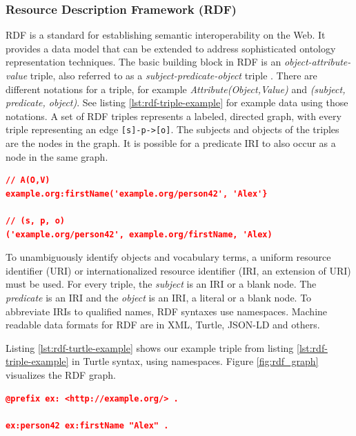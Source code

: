\subsubsection{Resource Description Framework (RDF)}
RDF is a standard for establishing semantic interoperability on the Web. 
It provides a data model that can be extended to address sophisticated ontology representation techniques.
The basic building block in RDF is an \textit{object-attribute-value} triple\cite{decker2000semantic}, also referred to as a \textit{subject-predicate-object} triple \cite{hogan2021knowledge}.
There are different notations for a triple, for example \textit{Attribute(Object,Value)} and \textit{(subject, predicate, object)}.
See listing \ref{lst:rdf-triple-example} for example data using those notations.
A set of RDF triples represents a labeled, directed graph, with every triple representing an edge \texttt{[s]-p->[o]}.
The subjects and objects of the triples are the nodes in the graph.
It is possible for a predicate IRI to also occur as a node in the same graph.\cite{w3c_rdf}


\begin{lstlisting}[language=json,basicstyle=\scriptsize,firstnumber=1,caption={Different notations for an RDF triple},captionpos=b,label={lst:rdf-triple-example}]
// A(O,V)
example.org:firstName('example.org/person42', 'Alex'}

// (s, p, o)
('example.org/person42', example.org/firstName, 'Alex)
\end{lstlisting}


To unambiguously identify objects and vocabulary terms, a uniform resource identifier (URI)\cite{berners2005uniform} or internationalized resource identifier (IRI, an extension of URI)\cite{rfc3987} must be used.
For every triple, the \textit{subject} is an IRI or a blank node.
The \textit{predicate} is an IRI and the \textit{object} is an IRI, a literal or a blank node.
To abbreviate IRIs to qualified names, RDF syntaxes use namespaces.\cite{w3c_rdf}
Machine readable data formats for RDF are in XML\cite{rdf_xml_syntax}, Turtle\cite{beckett2014rdf}, JSON-LD\cite{sporny2020json} and others\cite{ntriples, nquads, trig, grlicky2005overview}.

Listing \ref{lst:rdf-turtle-example} shows our example triple from listing \ref{lst:rdf-triple-example} in Turtle syntax, using namespaces.
Figure \ref{fig:rdf_graph} visualizes the RDF graph.

\begin{lstlisting}[language=json,basicstyle=\scriptsize,firstnumber=1,caption={RDF Graph in Turtle syntax},captionpos=b,label={lst:rdf-turtle-example}]
@prefix ex: <http://example.org/> .

ex:person42 ex:firstName "Alex" .
\end{lstlisting}


